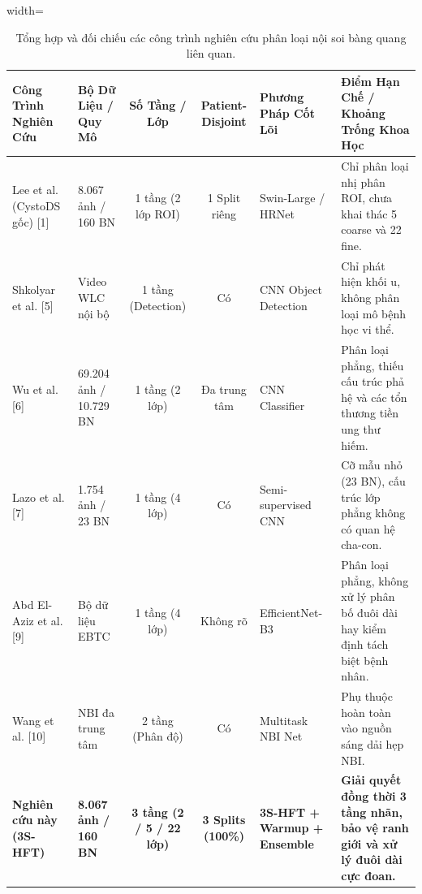 \begin{table}[t]
\centering
\small
\caption{Tổng hợp và đối chiếu các công trình nghiên cứu phân loại nội soi bàng quang liên quan.}
\label{tab:related_works}
\begin{adjustbox}{width=\textwidth}
\begin{tabular}{llccp{3.5cm}p{4.5cm}}
\toprule
\textbf{Công Trình Nghiên Cứu} & \textbf{Bộ Dữ Liệu / Quy Mô} & \textbf{Số Tầng / Lớp} & \textbf{Patient-Disjoint} & \textbf{Phương Pháp Cốt Lõi} & \textbf{Điểm Hạn Chế / Khoảng Trống Khoa Học} \\
\midrule
Lee et al. (CystoDS gốc) [1] & 8.067 ảnh / 160 BN & 1 tầng (2 lớp ROI) & 1 Split riêng & Swin-Large / HRNet & Chỉ phân loại nhị phân ROI, chưa khai thác 5 coarse và 22 fine. \\
Shkolyar et al. [5] & Video WLC nội bộ & 1 tầng (Detection) & Có & CNN Object Detection & Chỉ phát hiện khối u, không phân loại mô bệnh học vi thể. \\
Wu et al. [6] & 69.204 ảnh / 10.729 BN & 1 tầng (2 lớp) & Đa trung tâm & CNN Classifier & Phân loại phẳng, thiếu cấu trúc phả hệ và các tổn thương tiền ung thư hiếm. \\
Lazo et al. [7] & 1.754 ảnh / 23 BN & 1 tầng (4 lớp) & Có & Semi-supervised CNN & Cỡ mẫu nhỏ (23 BN), cấu trúc lớp phẳng không có quan hệ cha-con. \\
Abd El-Aziz et al. [9] & Bộ dữ liệu EBTC & 1 tầng (4 lớp) & Không rõ & EfficientNet-B3 & Phân loại phẳng, không xử lý phân bố đuôi dài hay kiểm định tách biệt bệnh nhân. \\
Wang et al. [10] & NBI đa trung tâm & 2 tầng (Phân độ) & Có & Multitask NBI Net & Phụ thuộc hoàn toàn vào nguồn sáng dải hẹp NBI. \\
\midrule
\textbf{Nghiên cứu này (3S-HFT)} & \textbf{8.067 ảnh / 160 BN} & \textbf{3 tầng (2 / 5 / 22 lớp)} & \textbf{3 Splits (100\%)} & \textbf{3S-HFT + Warmup + Ensemble} & \textbf{Giải quyết đồng thời 3 tầng nhãn, bảo vệ ranh giới và xử lý đuôi dài cực đoan.} \\
\bottomrule
\end{tabular}
\end{adjustbox}
\end{table}
